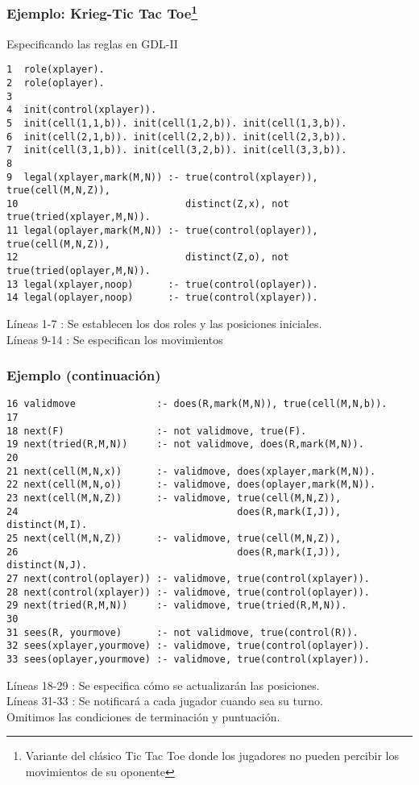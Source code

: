 \documentclass{beamer}
\begin{document}
\begin{frame}[fragile] %
\frametitle{Ejemplo: Krieg-Tic Tac Toe\footnote{Variante del clásico Tic Tac Toe donde los jugadores no pueden percibir los movimientos de su oponente}}
\begin{block}{Especificando las reglas en GDL-II}
\scriptsize \begin{verbatim}
1  role(xplayer).
2  role(oplayer).
3
4  init(control(xplayer)).
5  init(cell(1,1,b)). init(cell(1,2,b)). init(cell(1,3,b)).
6  init(cell(2,1,b)). init(cell(2,2,b)). init(cell(2,3,b)).
7  init(cell(3,1,b)). init(cell(3,2,b)). init(cell(3,3,b)).
8
9  legal(xplayer,mark(M,N)) :- true(control(xplayer)), true(cell(M,N,Z)),
10                             distinct(Z,x), not true(tried(xplayer,M,N)).
11 legal(oplayer,mark(M,N)) :- true(control(oplayer)), true(cell(M,N,Z)),
12                             distinct(Z,o), not true(tried(oplayer,M,N)).
13 legal(xplayer,noop)      :- true(control(oplayer)).
14 legal(oplayer,noop)      :- true(control(xplayer)).
\end{verbatim} 
\end{block}
\small {
Líneas 1-7  : Se establecen los dos roles y las posiciones iniciales.\\
Líneas 9-14 : Se especifican los movimientos }

\end{frame}


\begin{frame}[fragile] %
\frametitle{Ejemplo (continuación)}
\begin{block} {  }
\scriptsize \begin{verbatim}
16 validmove              :- does(R,mark(M,N)), true(cell(M,N,b)).
17
18 next(F)                :- not validmove, true(F).
19 next(tried(R,M,N))     :- not validmove, does(R,mark(M,N)).
20
21 next(cell(M,N,x))      :- validmove, does(xplayer,mark(M,N)).
22 next(cell(M,N,o))      :- validmove, does(oplayer,mark(M,N)).
23 next(cell(M,N,Z))      :- validmove, true(cell(M,N,Z)),
24                                      does(R,mark(I,J)), distinct(M,I).
25 next(cell(M,N,Z))      :- validmove, true(cell(M,N,Z)),
26                                      does(R,mark(I,J)), distinct(N,J).
27 next(control(oplayer)) :- validmove, true(control(xplayer)).
28 next(control(xplayer)) :- validmove, true(control(oplayer)).
29 next(tried(R,M,N))     :- validmove, true(tried(R,M,N)).
30
31 sees(R, yourmove)      :- not validmove, true(control(R)).
32 sees(xplayer,yourmove) :- validmove, true(control(oplayer)).
33 sees(oplayer,yourmove) :- validmove, true(control(xplayer)).
\end{verbatim} 
\end{block}
\small{
Líneas 18-29 : Se especifica cómo se actualizarán las posiciones.  \\
Líneas 31-33 : Se notificará a cada jugador cuando sea su turno. \\
Omitimos las condiciones de terminación y puntuación.
}
\end{frame}
\end{document}
